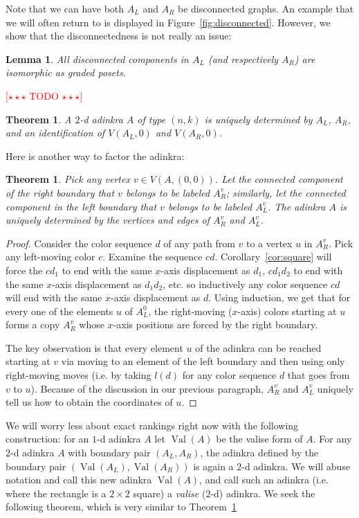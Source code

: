 \documentclass[12pt,twoside,singlespace]{article}
\numberwithin{equation}{section}
\newtheorem{thm}[equation]{Theorem}
\newtheorem{lem}[equation]{Lemma}
\theoremstyle{definition}
\newcommand{\on}{\operatorname}
\newcommand{\val}{\on{Val}}
\newcommand{\com}[1]{\textcolor{red}{$[\star \star \star$ #1 $\star \star \star]$}}
\begin{document}
Note that we can have both $A_L$ and $A_R$ be disconnected graphs. An example that we will often return to is displayed in Figure~\ref{fig:disconnected}. However, we show that the disconnectedness is not really an issue:
\begin{lem}
All disconnected components in $A_L$ (and respectively $A_R$) are isomorphic as graded posets.
\end{lem}
\com{TODO}

\begin{thm}
\label{thm:boundary factorization}
A $2$-d adinkra $A$ of type $(n,k)$ is uniquely determined by $A_L$, $A_R$, and an identification of $V(A_L, 0)$ and $V(A_R, 0)$.
\end{thm}

Here is another way to factor the adinkra:

\begin{thm}
\label{thm:connected component factorization}
Pick any vertex $v \in V(A, (0,0))$. Let the connected component of the right boundary that $v$ belongs to be labeled $A_R^v$; similarly, let the connected component in the left boundary that $v$ belongs to be labeled $A_L^v$. The adinkra $A$ is uniquely determined by the vertices and edges of $A_R^v$ and $A_L^v$.
\end{thm}
\begin{proof}
Consider the color sequence $d$ of any path from $v$ to a vertex $u$ in $A_R^v$. Pick any left-moving color $c$. Examine the sequence $cd$. Corollary~\ref{cor:square} will force the $cd_1$ to end with the same $x$-axis displacement as $d_1$, $cd_1d_2$ to end with the same $x$-axis displacement as $d_1d_2$, etc. so inductively any color sequence $cd$ will end with the same $x$-axis displacement as $d$. Using induction, we get that for every one of the elements $u$ of $A_L^0$, the right-moving ($x$-axis) colors starting at $u$ forms a copy $A_R^v$ whose $x$-axis positions are forced by the right boundary. 

The key observation is that every element $u$ of the adinkra can be reached starting at $v$ via moving to an element of the left boundary and then using only right-moving moves (i.e. by taking $l(d)$ for any color sequence $d$ that goes from $v$ to $u$). Because of the discussion in our previous paragraph, $A_R^v$ and $A_L^v$ uniquely tell us how to obtain the coordinates of $u$.
\end{proof}

We will worry less about exact rankings right now with the following construction: for an $1$-d adinkra $A$ let $\val(A)$ be the valise form of $A$. For any $2$-d adinkra $A$ with boundary pair $(A_L, A_R)$, the adinkra defined by the boundary pair $(\val(A_L), \val(A_R))$ is again a $2$-d adinkra. We will abuse notation and call this new adinkra $\val(A)$, and call such an adinkra (i.e. where the rectangle is a $2 \times 2$ square) a \emph{valise} ($2$-d) adinkra. We seek the following theorem, which is very similar to Theorem~\ref{thm:boundary factorization}
\end{document}
